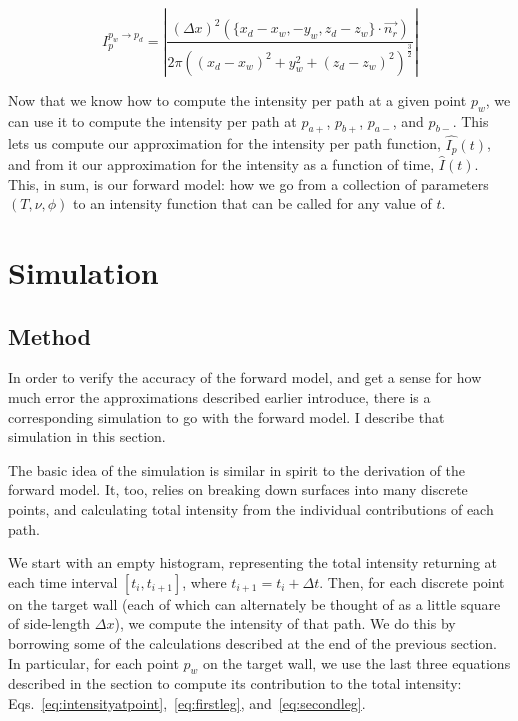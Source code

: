 \documentclass[11pt]{article}
\begin{document}
\begin{equation}
    I_p^{p_w \rightarrow p_d} = \left|\frac{(\Delta x)^2 (\{x_d-x_w, -y_w, z_d-z_w\} \cdot \vec{n_r})}{2 \pi ((x_d-x_w)^2 + y_w^2 + (z_d-z_w)^2)^{\frac{3}{2}}}\right|
    \label{eq:secondleg}
\end{equation}

Now that we know how to compute the intensity per path at a given point $p_w$, we can use it to compute the intensity per path at $p_{a+}$, $p_{b+}$, $p_{a-}$, and $p_{b-}$. This lets us compute our approximation for the intensity per path function, $\hat{I_p}(t)$, and from it our approximation for the intensity as a function of time, $\hat{I}(t)$. This, in sum, is our forward model: how we go from a collection of parameters $(T, \nu, \phi)$ to an intensity function that can be called for any value of $t$.

\section{Simulation}

\subsection{Method}

In order to verify the accuracy of the forward model, and get a sense for how much error the approximations described earlier introduce, there is a corresponding simulation to go with the forward model. I describe that simulation in this section.

The basic idea of the simulation is similar in spirit to the derivation of the forward model. It, too, relies on breaking down surfaces into many discrete points, and calculating total intensity from the individual contributions of each path.

We start with an empty histogram, representing the total intensity returning at each time interval $[t_i, t_{i+1}]$, where $t_{i+1} = t_i + \Delta t$. Then, for each discrete point on the target wall (each of which can alternately be thought of as a little square of side-length $\Delta x$), we compute the intensity of that path. We do this by borrowing some of the calculations described at the end of the previous section. In particular, for each point $p_w$ on the target wall, we use the last three equations described in the section to compute its contribution to the total intensity: Eqs.~\ref{eq:intensityatpoint},~\ref{eq:firstleg}, and~\ref{eq:secondleg}.
\end{document}
